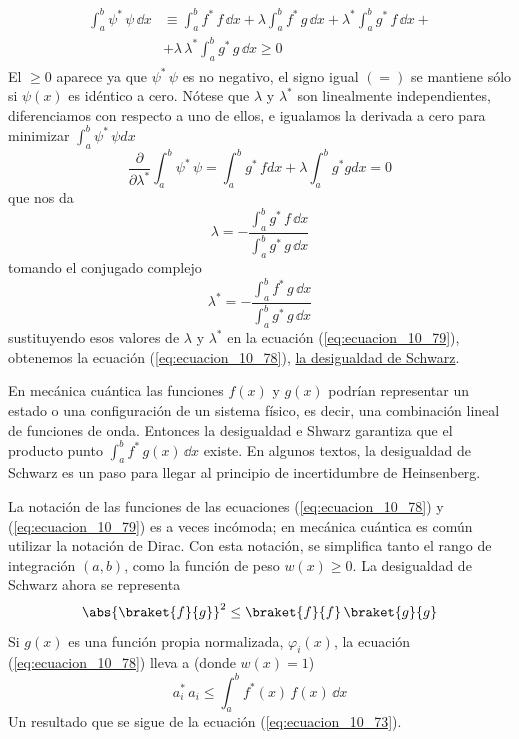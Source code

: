 \begin{align}
\begin{aligned}
\int_{a}^{b} \psi^{*} \, \psi \, \dd x &\equiv \int_{a}^{b} f^{*} \, f \, \dd x + \lambda \int_{a}^{b} f^{*} \, g \, \dd x + \lambda^{*} \int_{a}^{b} g^{*} \, f \, \dd x + \\
&+ \lambda \, \lambda^{*} \int_{a}^{b} g^{*} \, g \, \dd x  \geq 0
\end{aligned}
\label{eq:ecuacion_10_79}
\end{align}
El $\geq 0$ aparece ya que $\psi^{*} \, \psi$ es no negativo, el signo igual $(=)$ se mantiene sólo si $\psi (x)$ es idéntico a cero. Nótese que $\lambda$ y $\lambda^{*}$ son linealmente independientes, diferenciamos con respecto a uno de ellos, e igualamos la derivada a cero para minimizar $\int_{a}^{b} \psi^{*} \, \psi dx$
\begin{equation*}
\dfrac{\partial}{\partial \lambda^{*}} \int_{a}^{b} \psi^{*} \, \psi = \int_{a}^{b} g^{*} \,f dx  + \lambda \int_{a}^{b} g^{*} g dx = 0
\end{equation*}
que nos da
\begin{equation}
\lambda = - \dfrac{\int_{a}^{b} g^{*} \, f \, \dd x}{\int_{a}^{b} g^{*} \, g \, \dd x}
\label{eq:ecuacion_10_80a}
\end{equation}
tomando el conjugado complejo 
\begin{equation}
\lambda^{*} = - \dfrac{\int_{a}^{b} f^{*} \, g \, \dd x}{\int_{a}^{b} g^{*} \, g \, \dd x}
\label{eq:ecuacion_80b}
\end{equation}
sustituyendo esos valores de $\lambda$ y $\lambda^{*}$ en la ecuación (\ref{eq:ecuacion_10_79}), obtenemos la ecuación (\ref{eq:ecuacion_10_78}), \underline{la desigualdad de Schwarz}.
\par
En mecánica cuántica las funciones $f(x)$ y $g(x)$ podrían representar un estado o una configuración de un sistema físico, es decir, una combinación lineal de funciones de onda. Entonces la desigualdad e Shwarz garantiza que el producto punto $\int_{a}^{b} f^{*} \, g(x) \, \dd x$ existe. En algunos textos, la desigualdad de Schwarz es un paso para llegar al principio de incertidumbre de Heinsenberg.
\par
La notación de las funciones de las ecuaciones (\ref{eq:ecuacion_10_78}) y (\ref{eq:ecuacion_10_79}) es a veces incómoda; en mecánica cuántica es común utilizar la notación de Dirac. Con esta notación, se simplifica tanto el rango de integración $(a, b)$, como la función de peso $w(x) \geq 0$. La desigualdad de Schwarz ahora se representa
\begin{equation}
\abs{\braket{f}{g}}^{2} \leq \braket{f}{f} \, \braket{g}{g}
\label{eq:ecuacion_10_78a}
\end{equation}
Si $g(x)$ es una función propia normalizada, $\varphi_{i}(x)$, la ecuación (\ref{eq:ecuacion_10_78}) lleva a (donde $w(x)=1$)
\begin{equation}
a_{i}^{*} \, a_{i} \leq \int_{a}^{b} f^{*}(x) \, f(x) \, \dd x 
\label{eq:ecuacion_10_81}
\end{equation}
Un resultado que se sigue de la ecuación (\ref{eq:ecuacion_10_73}).

